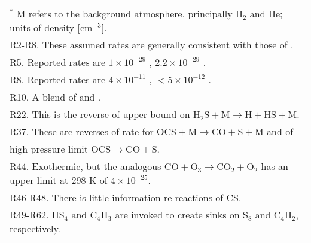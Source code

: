 \documentclass[preprint]{aastex6}
\newcounter{reaction}
\begin{document}
\begin{longtable}{l lcl l p{3.5cm} }
\hline
\hline
\multicolumn{6}{l}{ $^{\ast}$ M refers to the background atmosphere, principally H$_2$ and He; units of density [cm$^{-3}$].}\\
\multicolumn{6}{l}{R2-R8. These assumed rates are generally consistent with those of \citet{Moses2002,Yung2009}.}\\
\multicolumn{6}{l}{R5. Reported rates are $1\times 10^{-29}$ \citep{Langford1973}, $2.2\times 10^{-29}$ \citep{Nicholas1979}.}\\
\multicolumn{6}{l}{R8. Reported rates are $4\times 10^{-11}$ \citep{Schofield1973}, $<5\times 10^{-12}$ \citep{Nicholas1979}.}\\
\multicolumn{6}{l}{R10. A blend of \citet{Woiki1995a} and \citet{Shiina1998}.}\\
\multicolumn{6}{l}{R22. This is the reverse of \citet{Shiina1998} upper bound on $\mathrm{H}_2\mathrm{S} + \mathrm{M} \rightarrow \mathrm{H}+\mathrm{HS} + \mathrm{M} $.}\\
\multicolumn{6}{l}{R37. These are reverses of \citet{Oya1994} rate for $\mathrm{OCS} + \mathrm{M} \rightarrow \mathrm{CO}+\mathrm{S} + \mathrm{M} $ and of }\\
\multicolumn{6}{l}{\phantom{R37. }\citet{Schofield1973} high pressure limit $\mathrm{OCS} \rightarrow \mathrm{CO}+\mathrm{S} $.}\\
\multicolumn{6}{l}{R44. Exothermic, but the analogous $\mathrm{CO} + \mathrm{O}_3 \rightarrow \mathrm{CO}_2+\mathrm{O}_2$ has an upper limit at 298 K of $4\times 10^{-25}$.}\\
\multicolumn{6}{l}{R46-R48. There is little information re reactions of CS.}\\
\multicolumn{6}{l}{R49-R62. HS$_4$ and C$_4$H$_3$ are invoked to create sinks on S$_8$ and C$_4$H$_2$, respectively.}\\
\end{longtable}  



 
\end{document}
